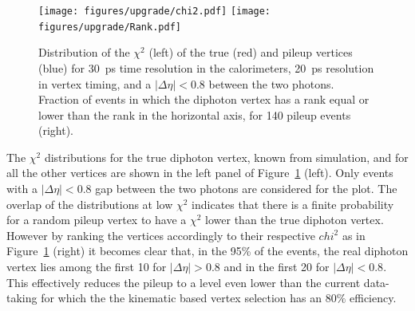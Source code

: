 \begin{figure}[htb!]
\centering
\texttt{[image: figures/upgrade/chi2.pdf]}
\texttt{[image: figures/upgrade/Rank.pdf]}
\caption{Distribution of the $\chi^2$ (left) of the true \Hgg (red) and pileup vertices (blue) for 30~ps
  time resolution in the calorimeters, 20~ps resolution in vertex timing,
  and a $|\Delta\eta|<0.8$ between the two photons. Fraction
  of events in which the diphoton vertex has a rank equal or lower
  than the rank in the horizontal axis, for 140 pileup events (right).} 
\label{fig:chi2Hgg}
\end{figure}

The $\chi^2$ distributions for the true diphoton vertex, known from
simulation, and for all the other vertices are shown in the left panel
of Figure~\ref{fig:chi2Hgg} (left).  
Only events with a $|\Delta\eta|<0.8$ gap between the two photons are considered for the plot.
The overlap of the distributions at low $\chi^2$ indicates that there is a finite
probability for a random pileup vertex to have a $\chi^2$ lower than
the true diphoton vertex.
However by ranking the vertices accordingly to their respective $chi^2$ 
as in Figure~\ref{fig:chi2Hgg} (right) it becomes clear that, in the 95\% of the events,
the real diphoton vertex lies among the first 10 for $|\Delta\eta|>0.8$ and
in the first 20 for $|\Delta\eta|<0.8$. This effectively reduces the pileup to
a level even lower than the current data-taking for which the the kinematic based vertex selection
has an $80\%$ efficiency.


 

